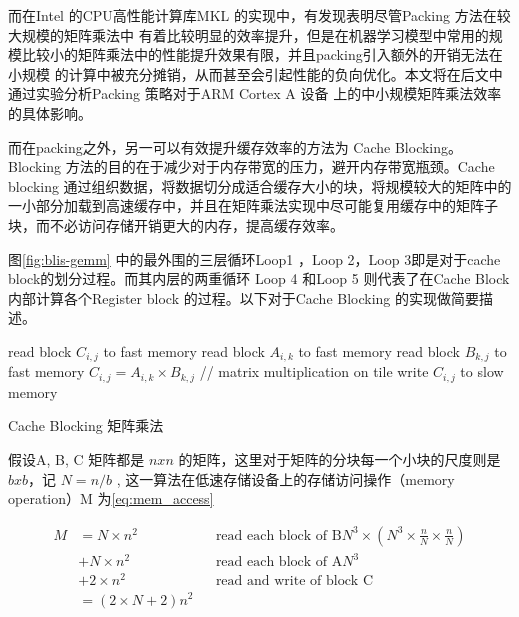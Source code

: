 而在Intel 的CPU高性能计算库MKL 的实现中，有发现\cite{mkl_gemm_pack}表明尽管Packing 方法在较大规模的矩阵乘法中
有着比较明显的效率提升，但是在机器学习模型中常用的规模比较小的矩阵乘法中的性能提升效果有限，并且packing引入额外的开销无法在小规模
的计算中被充分摊销，从而甚至会引起性能的负向优化。本文将在后文中通过实验分析Packing 策略对于ARM Cortex A 设备
上的中小规模矩阵乘法效率的具体影响。

而在packing之外，另一可以有效提升缓存效率的方法为 Cache Blocking。Blocking 方法的目的在于减少对于内存带宽的压力，避开内存带宽瓶颈。Cache blocking 通过组织数据，将数据切分成适合缓存大小的块，将规模较大的矩阵中的一小部分加载到高速缓存中，并且在矩阵乘法实现中尽可能复用缓存中的矩阵子块，而不必访问存储开销更大的内存，提高缓存效率。

图\ref{fig:blis-gemm} 中的最外围的三层循环Loop1 ，Loop 2，Loop 3即是对于cache block的划分过程。而其内层的两重循环
Loop 4 和Loop 5 则代表了在Cache Block内部计算各个Register block 的过程。以下对于Cache Blocking 的实现做简要描述。

\begin{algorithm}
  \begin{algorithmic}
        \State read block $C_{i,j}$ to fast memory
          \State read block $A_{i, k}$ to fast memory
          \State read block $B_{k, j}$ to fast memory
          \State $C_{i, j} = A_{i, k} \times B_{k, j}$ // matrix multiplication on tile
        \State write $C_{i, j}$ to slow memory
        \EndFor
      \EndFor
    \EndFor
  \end{algorithmic}
  \caption{Cache Blocking 矩阵乘法}
  \label{code:tiled_matmul}
\end{algorithm}

假设A, B, C 矩阵都是 $n x n$ 的矩阵，这里对于矩阵的分块每一个小块的尺度则是 $b x b$，记 $N = n / b$ , 这一算法在低速存储设备上的存储访问操作（memory operation）M 为\ref{eq:mem_access}

\begin{align}
  M &= N \times n^2 && \text{read each block of B} N^3 \times (N^3 \times \frac{n}{N} \times \frac{n}{N} ) \\
    &+ N \times n^2 && \text{read each block of A} N^3\\
    &+ 2 \times n^2 && \text{read and write of block C}\\
    &= (2\times N + 2)n^2
\label{eq:mem_access}
\end{align}

